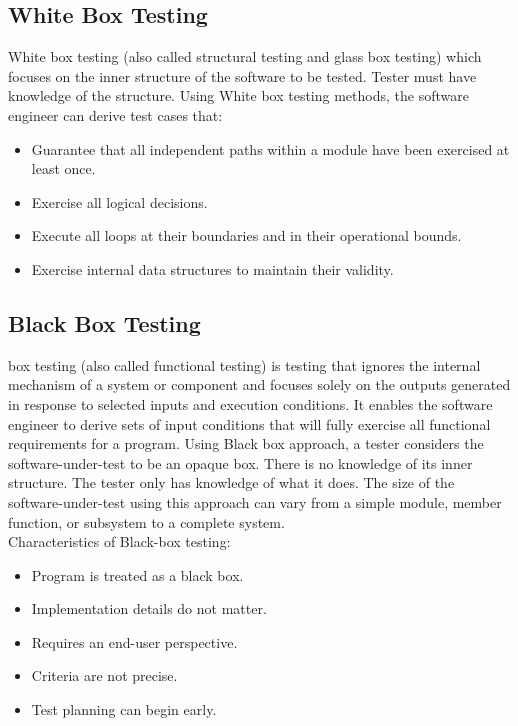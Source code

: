 \documentclass{SureshLimkar}
\begin{document}
\subsection{White Box Testing}
\hspace{0.5 in}White box testing (also called structural testing and glass box testing) which focuses on the inner structure of the software to be tested. Tester must have knowledge of the structure. Using White box testing methods, the software engineer can derive test cases that:
\\
\begin{itemize}
 \item Guarantee that all independent paths within a module have been exercised at least once.
\item Exercise all logical decisions.
\item Execute all loops at their boundaries and in their operational bounds.
\item Exercise internal data structures to maintain their validity.
\end{itemize}

\subsection{Black Box Testing}
\hspace{0.5 in} box testing (also called functional testing) is testing that ignores the internal mechanism of a system or component and focuses solely on the outputs generated in response to selected inputs and execution conditions. It enables the software engineer to derive sets of input conditions that will fully exercise all functional requirements for a program. Using Black box approach, a tester considers the software-under-test to be an opaque box. There is no knowledge of its inner structure. The tester only has knowledge of what it does. The size of the software-under-test using this approach can vary from a simple module, member function, or subsystem to a complete system.
\\
Characteristics of Black-box testing:
\begin{itemize}
\item Program is treated as a black box.
\item Implementation details do not matter.
\item Requires an end-user perspective.
\item Criteria are not precise.
\item Test planning can begin early. 
\end{itemize}
\end{document}

